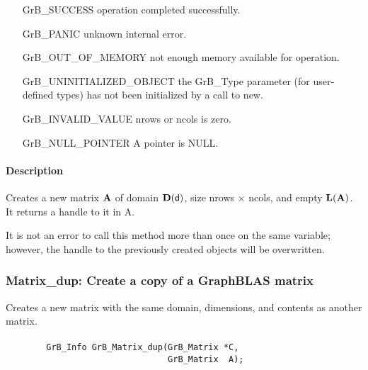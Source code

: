 \begin{itemize}[leftmargin=2.1in]
\item[{\sf GrB\_SUCCESS}]   operation completed successfully.
\item[{\sf GrB\_PANIC}]     unknown internal error.
\item[{\sf GrB\_OUT\_OF\_MEMORY}]  not enough memory available for operation.
\item[{\sf GrB\_UNINITIALIZED\_OBJECT}]   the {\sf GrB\_Type} parameter (for user-defined
                             types) has not been initialized by a
                             call to {\sf new}.
\item[{\sf GrB\_INVALID\_VALUE}]    {\sf nrows} or {\sf ncols} is zero.
\item[{\sf GrB\_NULL\_POINTER}]    {\sf A} pointer is {\sf NULL}.
\end{itemize}

\paragraph{Description}

Creates a new matrix ${\bf A}$ of domain $\bold{D}({\sf d})$, size 
{\sf nrows $\times$ ncols}, and empty $\bold{L}({\bf A})$. It returns a
handle to it in {\sf A}.

It is not an error to call this method more than once on the same variable;  
however, the handle to the previously created objects will be overwritten. 

\subsubsection{{\sf Matrix\_dup}: Create a copy of a GraphBLAS matrix}

Creates a new matrix with the same domain, dimensions, and contents as 
another matrix.

\paragraph{\syntax}

\begin{verbatim}
        GrB_Info GrB_Matrix_dup(GrB_Matrix *C,
                                GrB_Matrix  A);
\end{verbatim}

